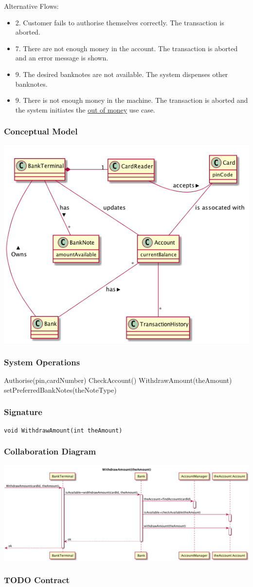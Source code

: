 \documentclass[11pt]{article}
\begin{document}
Alternative Flows:
\begin{itemize}
\item 2. Customer fails to authorise themselves correctly. The transaction is aborted.
\item 7. There are not enough money in the account. The transaction is aborted and an error message is shown.
\item 9. The desired banknotes are not available. The system dispenses other banknotes.
\item 9. There is not enough money in the machine. The transaction is aborted and the system initiates the \uline{out of money} use case.
\end{itemize}

\subsubsection{Conceptual Model}
\label{sec:orgheadline12}
\includegraphics[width=.9\linewidth]{FConceptual2_20160109_SOLVED.png}

\subsubsection{System Operations}
\label{sec:orgheadline13}
Authorise(pin,cardNumber)
CheckAccount()
WithdrawAmount(theAmount)
setPreferredBankNotes(theNoteType)   
\subsubsection{Signature}
\label{sec:orgheadline14}
\texttt{void WithdrawAmount(int theAmount)}
\subsubsection{Collaboration Diagram}
\label{sec:orgheadline15}
\includegraphics[width=.9\linewidth]{FCollaboration-20160109_SOLVED.png}

\subsubsection{{\bfseries\sffamily TODO} Contract}
\label{sec:orgheadline16}
\end{document}
